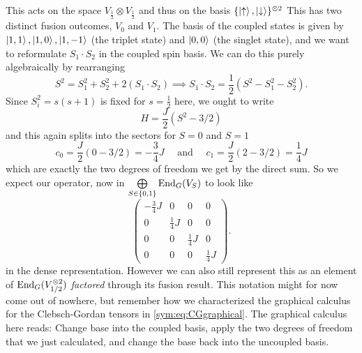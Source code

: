 This acts on the space $V_{\frac{1}{2}} \otimes V_{\frac{1}{2}}$ and thus on the
basis $\{\left| \uparrow \right\rangle,\left| \downarrow \right\rangle\}^{\otimes 2}$ This has two distinct
fusion outcomes, $V_0$ and $V_1$. The basis of the coupled states is given by
$\left| 1,1 \right\rangle,\left| 1,0 \right\rangle,\left| 1,-1 \right\rangle$ (the triplet state) and $\left| 0,0 \right\rangle$ (the
singlet state), and we want to reformulate $S_1 \cdot S_2$ in the coupled spin
basis. We can do this purely algebraically by rearranging
\[
  S^2 = S_1^2 + S_2^2 + 2(S_1 \cdot S_2) \implies S_1 \cdot S_2 = \frac{1}{2}(S^2 - S_1^2 - S_2^2).
\]
Since $S_i^2 = s(s+1)$ is fixed for $s = \frac{1}{2}$ here, we ought to write
\[
  H = \frac{J}{2}(S^2 - 3/2)
\]
and this again splits into the sectors for $S = 0$ and $S = 1$
\[
  c_0 = \frac{J}{2}(0 - 3/2) = -\frac{3}{4}J
  \quad \text{ and } \quad
  c_1 = \frac{J}{2}(2 - 3/2) = \frac{1}{4}J
\]
which are exactly the two degrees of freedom we get by the direct sum. So we
expect our operator, now in $\bigoplus\limits_{S \in \{0,1\}} \operatorname{End}_G(V_S)$ to look
like
\[
  \left(\begin{array}{c|ccc}
    -\frac{3}{4}J &  0 & 0 & 0 \\ 
    \hline
    0 & \frac{1}{4}J & 0 & 0  \\
    0 & 0 & \frac{1}{4}J & 0 \\
    0 & 0 & 0 & \frac{1}{4}J
  \end{array}\right).
\]
in the dense representation. However we can also still represent this as an
element of $\operatorname{End}_G(V_{1/2}^{\otimes 2})$ \emph{factored} through its fusion result.
This notation might for now come out of nowhere, but remember how we
characterized the graphical calculus for the Clebsch-Gordan tensors in
\eqref{sym:eq:CGgraphical}. The graphical calculus here reads: Change base into
the coupled basis, apply the two degrees of freedom that we just calculated, and
change the base back into the uncoupled basis.

